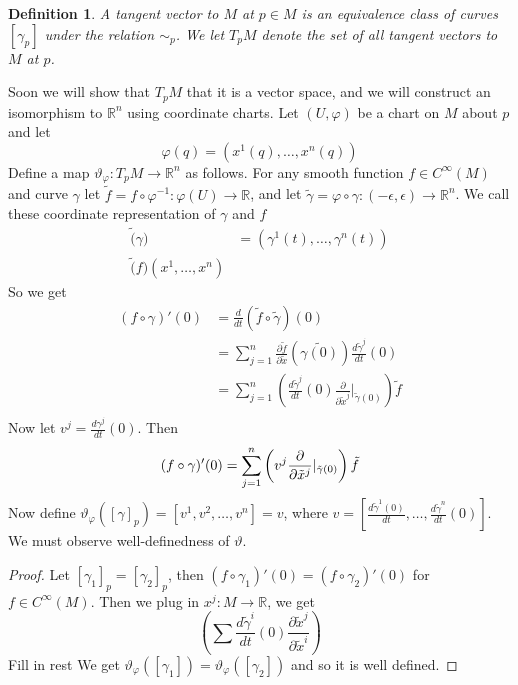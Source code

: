 \documentclass[a4paper]{article}
\newtheorem*{defn}{Definition}
\begin{document}
\begin{defn}
    A tangent vector to $M$ at $p \in M$ is an equivalence class of curves $[\gamma_p]$ under the relation $\sim_p$. We let $T_pM$ denote the set of all tangent vectors to $M$ at $p$.
\end{defn}
Soon we will show that $T_pM$ that it is a vector space, and we will construct an isomorphism to $\mathds{R}^n$ using coordinate charts. Let $(U, \varphi)$ be a chart on $M$ about $p$ and let 
\[
    \varphi(q) = (x^1(q), \dots, x^n(q))
\]
Define a map $\vartheta_{\varphi}: T_pM \rightarrow \mathds{R}^n$ as follows. For any smooth function $f \in C^{\infty}(M)$ and curve $\gamma$ let $\tilde{f} = f \circ \varphi^{-1}: \varphi(U) \rightarrow \mathds{R}$, and let $\tilde{\gamma} = \varphi \circ \gamma: (-\epsilon, \epsilon) \rightarrow \mathds{R}^n$. We call these coordinate representation of $\gamma$ and $f$
\[
    \begin{aligned}
        \tilde(\gamma) &= (\gamma^1(t), \dots, \gamma^n(t)) \\
        \tilde(f)(x^1, \dots, x^n)
    \end{aligned}
\]
So we get 
\[
    \begin{aligned}
        (f \circ \gamma)'(0) &= \frac{d}{dt}(\tilde{f} \circ \tilde{\gamma})(0) \\
                             &= \sum_{j=1}^n \frac{\partial \tilde{f}}{\partial \tilde{x}}(\tilde{\gamma(0)}) \frac{d \tilde{\gamma}^j}{dt}(0) \\
                             &= \sum_{j=1}^n \left(\frac{d \tilde{\gamma}^j}{dt}(0) \frac{\partial}{\partial \tilde{x}^j} |_{\tilde{\gamma}(0)}  \right)\tilde{f} \\
    \end{aligned}
\]
Now let $v^j = \frac{d\gamma^j}{dt}(0)$. Then
\[
    (f \circ \gamma)'(0) = \sum_{j=1}^n \left(v^j \frac{\partial}{\partial \tilde{x}^j} |_{\tilde{\gamma}(0)}  \right)\tilde{f} \\
\]
Now define $\vartheta_{\varphi}([\gamma]_p) = [v^1, v^2, \dots, v^n] = v$, where $v = \left[\frac{d \tilde{\gamma}^1(0)}{dt}, \dots, \frac{d \tilde{\gamma}^n}{dt}(0)\right]$. We must observe well-definedness of $\vartheta$.
\begin{proof}
    Let $[\gamma_1]_p = [\gamma_2]_p$, then $(f \circ \gamma_1)'(0) = (f \circ \gamma_2)'(0)$ for $f \in C^{\infty}(M)$. Then we plug in $x^j: M \rightarrow \mathds{R}$, we get
    \[
        \left( \sum \frac{d \tilde{\gamma}^i}{dt}(0) \frac{\partial \tilde{x}^j}{\partial \tilde{x}^i} \right)
    \]
    Fill in rest
    We get $\vartheta_{\varphi}([\gamma_1]) = \vartheta_{\varphi}([\gamma_2])$ and so it is well defined.
\end{proof}
\end{document}
